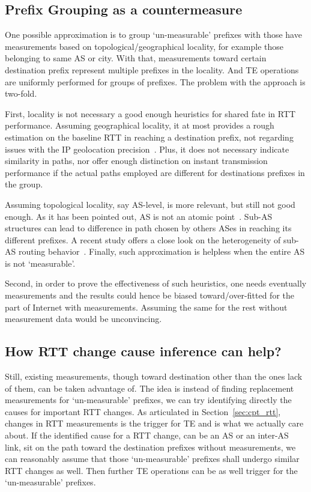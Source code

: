 \subsection{Prefix Grouping as a countermeasure}
One possible approximation is to group `un-measurable' prefixes with those have measurements based on topological/geographical locality, for example those belonging to same AS or city. With that, measurements toward certain destination prefix represent multiple prefixes in the locality. And TE operations are uniformly performed for groups of prefixes.
The problem with the approach is two-fold. 

First, locality is not necessary a good enough heuristics for shared fate in RTT performance. 
Assuming geographical locality, it at most provides a rough estimation on the baseline RTT in reaching a destination prefix, not regarding issues with the IP geolocation precision~\cite{Poese2011}. Plus, it does not necessary indicate similarity in paths, nor offer enough distinction on instant transmission performance if the actual paths employed are different for destinations prefixes in the group.

Assuming topological locality, say AS-level, is more relevant, but still not good enough.
As it has been pointed out, AS is not an atomic point~\cite{Muhlbauer2006}. Sub-AS structures can lead to difference in path chosen by others ASes in reaching its different prefixes. A recent study offers a close look on the heterogeneity of sub-AS routing behavior~\cite{Lee2016}. Finally, such approximation is helpless when the entire AS is not `measurable'.

Second, in order to prove the effectiveness of such heuristics, one needs eventually measurements and the results could hence be biased toward/over-fitted for the part of Internet with measurements. Assuming the same for the rest without measurement data would be unconvincing.

\subsection{How RTT change cause inference can help?}
Still, existing measurements, though toward destination other than the ones lack of them, can be taken advantage of. The idea is instead of finding replacement measurements for `un-measurable' prefixes, we can try identifying directly the causes for important RTT changes. As articulated in Section~\ref{sec:cpt_rtt}, changes in RTT measurements is the trigger for TE and is what we actually care about. If the identified cause for a RTT change, can be an AS or an inter-AS link, sit on the path toward the destination prefixes without measurements, we can reasonably assume that those `un-measurable' prefixes shall undergo similar RTT changes as well. Then further TE operations can be as well trigger for the `un-measurable' prefixes.

